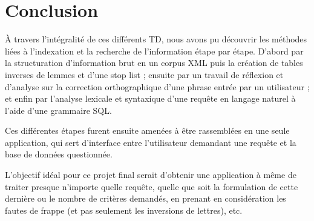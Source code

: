 \chapter{Conclusion}

À travers l'intégralité de ces différents TD, nous avons pu découvrir les méthodes liées à l'indexation et la recherche de l'information étape par étape. D'abord par la structuration d'information brut en un corpus XML puis la création de tables inverses de lemmes et d'une stop list ; ensuite par un travail de réflexion et d'analyse sur la correction orthographique d'une phrase entrée par un utilisateur ; et enfin par l'analyse lexicale et syntaxique d'une requête en langage naturel à l'aide d'une grammaire SQL.

\medskip

Ces différentes étapes furent ensuite amenées à être rassemblées en une seule application, qui sert d'interface entre l'utilisateur demandant une requête et la base de données questionnée.

\medskip

L'objectif idéal pour ce projet final serait d'obtenir une application à même de traiter presque n'importe quelle requête, quelle que soit la formulation de cette dernière ou le nombre de critères demandés, en prenant en considération les fautes de frappe (et pas seulement les inversions de lettres), etc.
